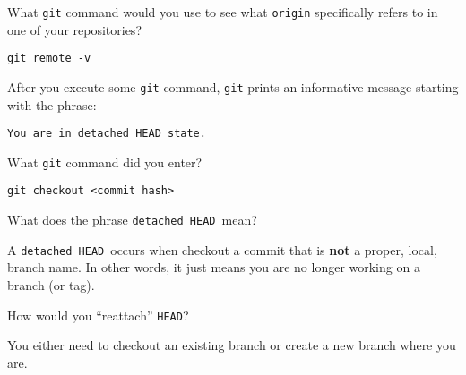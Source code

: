 \documentclass[10pt]{examdesign}
\begin{document}
\begin{shortanswer}[title={Short Answer (2 pts each)},
                    rearrange=no,resetcounter=no]
\begin{block}[questions=3]
\begin{question}
  What \texttt{git} command would you use to see what \texttt{origin}
  specifically refers to in one of your repositories?
  \vspace{5mm}
  \begin{answer}
    \texttt{git remote -v}
  \end{answer}
\end{question}

\end{block}


\begin{block}[questions=3]
After you execute some \texttt{git} command, \texttt{git} prints
an informative message starting with the phrase:

\vspace{4mm}
\texttt{You are in \textquotesingle detached HEAD\textquotesingle\  state.}

\begin{question}
  What \texttt{git} command did you enter?
  \vspace{5mm}
  \begin{answer}
    \texttt{git checkout <commit hash>}
  \end{answer}
\end{question}

\begin{question}
  What does the phrase
  \texttt{\textquotesingle detached HEAD\textquotesingle}\ mean?
  \vspace{5mm}
  \begin{answer}
    A \texttt{\textquotesingle detached HEAD\textquotesingle}\ occurs
    when checkout a commit that is \textbf{not} a proper, local,
    branch name. In other words, it just means you are no longer
    working on a branch (or tag).
  \end{answer}
\end{question}

\begin{question}
  How would you ``reattach'' \texttt{HEAD}? 
  \vspace{5mm}
  \begin{answer}
    You either need to checkout an existing branch or create a new
    branch where you are.
  \end{answer}
\end{question}

\end{block}

\end{shortanswer}
\end{document}
